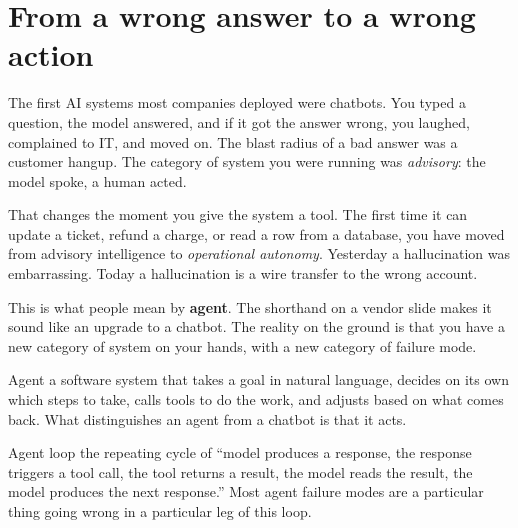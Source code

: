 \label{ch:10-alignment-01-what-it-means}

\starttwocol

\section{From a wrong answer to a wrong action}

The first AI systems most companies deployed were chatbots. You typed a question, the model answered, and if it got the answer wrong, you laughed, complained to IT, and moved on. The blast radius of a bad answer was a customer hangup. The category of system you were running was \textit{advisory}: the model spoke, a human acted.

That changes the moment you give the system a tool. The first time it can update a ticket, refund a charge, or read a row from a database, you have moved from advisory intelligence to \textit{operational autonomy}. Yesterday a hallucination was embarrassing. Today a hallucination is a wire transfer to the wrong account.

This is what people mean by \textbf{agent}. The shorthand on a vendor slide makes it sound like an upgrade to a chatbot. The reality on the ground is that you have a new category of system on your hands, with a new category of failure mode.

\begin{TNdefinition}{Agent} a software system that takes a goal in natural language, decides on its own which steps to take, calls tools to do the work, and adjusts based on what comes back. What distinguishes an agent from a chatbot is that it acts. \end{TNdefinition}

\begin{TNdefinition}{Agent loop} the repeating cycle of ``model produces a response, the response triggers a tool call, the tool returns a result, the model reads the result, the model produces the next response.'' Most agent failure modes are a particular thing going wrong in a particular leg of this loop. \end{TNdefinition}

